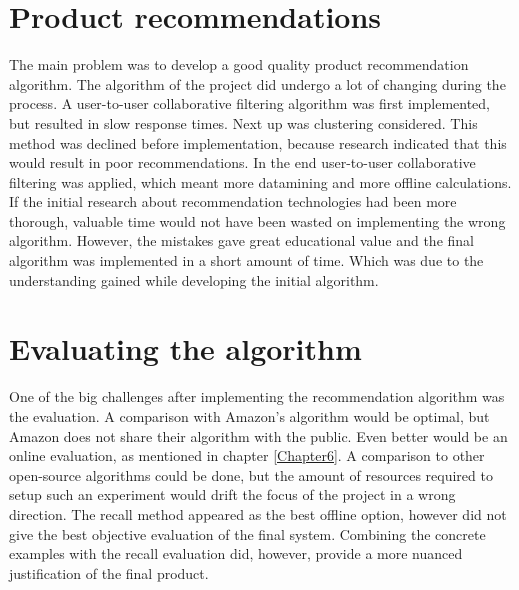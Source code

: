 \section{Product recommendations}
The main problem was to develop a good quality product recommendation algorithm. The algorithm of the project did undergo a lot of changing during the process. A user-to-user collaborative filtering algorithm was first implemented, but resulted in slow response times. Next up was clustering considered. This method was declined before implementation, because research indicated that this would result in poor recommendations. \cite{AmazonRecommendations} In the end user-to-user collaborative filtering was applied, which meant more datamining and more offline calculations. If the initial research about recommendation technologies had been more thorough, valuable time would not have been wasted on implementing the wrong algorithm. However, the mistakes gave great educational value and the final algorithm was implemented in a short amount of time. Which was due to the understanding gained while developing the initial algorithm.

\section{Evaluating the algorithm}
One of the big challenges after implementing the recommendation algorithm was the evaluation. A comparison with Amazon's algorithm would be optimal, but Amazon does not share their algorithm with the public. Even better would be an online evaluation, as mentioned in chapter \ref{Chapter6}. A comparison to other open-source algorithms could be done, but the amount of resources required to setup such an experiment would drift the focus of the project in a wrong direction. The recall method appeared as the best offline option, however did not give the best objective evaluation of the final system. Combining the concrete examples with the recall evaluation did, however, provide a more nuanced justification of the final product.